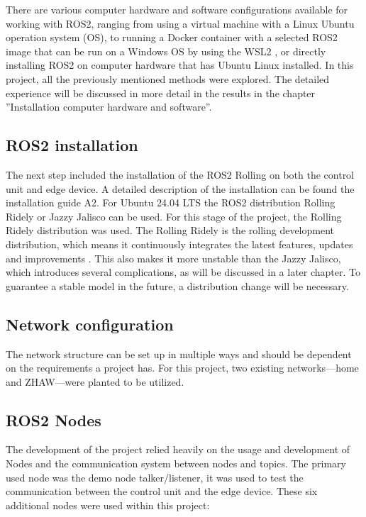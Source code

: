 There are various computer hardware and software configurations available for working with ROS2, ranging from using a virtual machine with a Linux Ubuntu operation system (OS), to running a Docker container with a selected ROS2 image that can be run on a Windows OS by using the WSL2 \autocite{dockerRosOfficialImage}, or directly installing ROS2 on computer hardware that has Ubuntu Linux installed.
 In this project, all the previously mentioned methods were explored. The detailed experience will be discussed in more detail in the results in the chapter ''Installation computer hardware and software''.

\subsection{ROS2 installation}

The next step included the installation of the ROS2 Rolling on both the control unit and edge device. A detailed description of the installation can be found the installation guide A2. For Ubuntu 24.04 LTS the ROS2 distribution Rolling Ridely or Jazzy Jalisco can be used. For this stage of the project, the Rolling Ridely distribution was used. The Rolling Ridely is the rolling development distribution, which means it continuously integrates the latest features, updates and improvements \autocite{openroboticsDistributionsROS2}. This also makes it more unstable than the Jazzy Jalisco, which introduces several complications, as will be discussed in a later chapter. To guarantee a stable model in the future, a distribution change will be necessary. 

\subsection{Network configuration}

The network structure can be set up in multiple ways and should be dependent on the requirements a project has. For this project, two existing networks—home and ZHAW—were planted to be utilized. 


\subsection{ROS2 Nodes}

The development of the project relied heavily on the usage and development of Nodes and the communication system between nodes and topics. The primary used node was the demo node talker/listener, it was used to test the communication between the control unit and the edge device. These six additional nodes were used within this project: 

